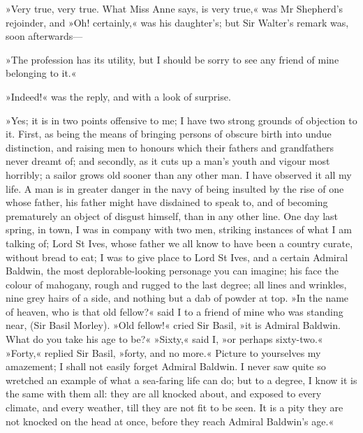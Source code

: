 »Very true, very true. What Miss Anne says, is very true,« was Mr Shepherd's rejoinder, and »Oh! certainly,« was his daughter's; but Sir Walter's remark was, soon afterwards—

»The profession has its utility, but I should be sorry to see any friend of mine belonging to it.«

»Indeed!« was the reply, and with a look of surprise.

»Yes; it is in two points offensive to me; I have two strong grounds of objection to it. First, as being the means of bringing persons of obscure birth into undue distinction, and raising men to honours which their fathers and grandfathers never dreamt of; and secondly, as it cuts up a man's youth and vigour most horribly; a sailor grows old sooner than any other man. I have observed it all my life. A man is in greater danger in the navy of being insulted by the rise of one whose father, his father might have disdained to speak to, and of becoming prematurely an object of disgust himself, than in any other line. One day last spring, in town, I was in company with two men, striking instances of what I am talking of; Lord St Ives, whose father we all know to have been a country curate, without bread to eat; I was to give place to Lord St Ives, and a certain Admiral Baldwin, the most deplorable-looking personage you can imagine; his face the colour of mahogany, rough and rugged to the last degree; all lines and wrinkles, nine grey hairs of a side, and nothing but a dab of powder at top. »In the name of heaven, who is that old fellow?« said I to a friend of mine who was standing near, (Sir Basil Morley). »Old fellow!« cried Sir Basil, »it is Admiral Baldwin. What do you take his age to be?« »Sixty,« said I, »or perhaps sixty-two.« »Forty,« replied Sir Basil, »forty, and no more.« Picture to yourselves my amazement; I shall not easily forget Admiral Baldwin. I never saw quite so wretched an example of what a sea-faring life can do; but to a degree, I know it is the same with them all: they are all knocked about, and exposed to every climate, and every weather, till they are not fit to be seen. It is a pity they are not knocked on the head at once, before they reach Admiral Baldwin's age.«

